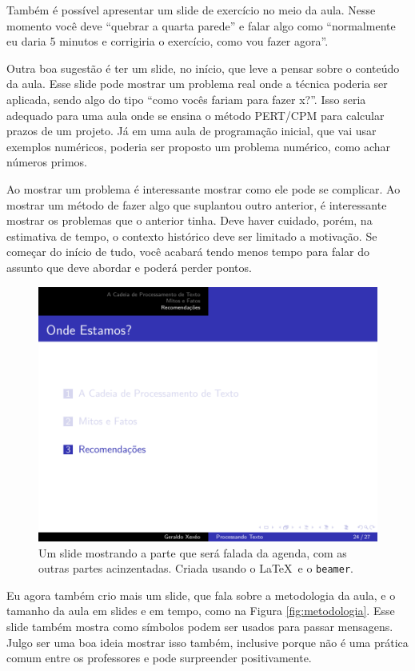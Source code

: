 Também é possível apresentar um slide de exercício no meio da aula. Nesse momento você deve ``quebrar a quarta parede'' e falar algo como ``normalmente eu daria 5 minutos e corrigiria o exercício, como vou fazer agora''.

Outra boa sugestão é ter um slide, no início, que leve a pensar sobre o conteúdo da aula. Esse slide pode mostrar um problema real onde a técnica poderia ser aplicada, sendo algo do tipo ``como vocês fariam para fazer x?''. Isso seria adequado para uma aula onde se ensina o método PERT/CPM para calcular prazos de um projeto. Já em uma aula de programação inicial, que vai usar exemplos numéricos, poderia ser proposto um problema numérico, como achar números primos.

Ao mostrar um problema é interessante mostrar como ele pode se complicar. Ao mostrar um método de fazer algo que suplantou outro anterior, é interessante mostrar os problemas que o anterior tinha. Deve haver cuidado, porém, na estimativa de tempo, o contexto histórico deve ser limitado a motivação. Se começar do início de tudo, você acabará tendo menos tempo para falar do assunto que deve abordar e poderá perder pontos.

\begin{figure}[hb]
    \centering
    \includegraphics[width=\tam\linewidth]{imagens/agendadomeio.png}
    \caption{Um slide mostrando a parte que será falada da agenda, com as outras partes acinzentadas. Criada usando o \LaTeX\  e o \texttt{beamer}.}
    \label{fig:meio}
\end{figure}

Eu agora também crio mais um slide, que fala sobre a metodologia da aula, e o tamanho da aula em slides e em tempo, como na Figura \ref{fig:metodologia}. Esse slide também mostra como símbolos podem ser usados para passar mensagens. Julgo ser  uma boa ideia mostrar isso também, inclusive porque não é uma prática comum entre os professores e pode surpreender positivamente.

